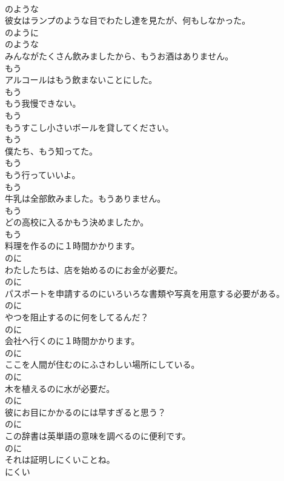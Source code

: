 \documentclass[8pt]{extreport}
\begin{document}
\begin{CJK}{UTF8}{min}
\\	のような	
\\	彼女はランプのような目でわたし達を見たが、何もしなかった。	
\\	のように 
\\	のような	
\\	みんながたくさん飲みましたから、もうお酒はありません。	
\\	もう	
\\	アルコールはもう飲まないことにした。	
\\	もう	
\\	もう我慢できない。	
\\	もう	
\\	もうすこし小さいボールを貸してください。	
\\	もう	
\\	僕たち、もう知ってた。	
\\	もう	
\\	もう行っていいよ。	
\\	もう	
\\	牛乳は全部飲みました。もうありません。	
\\	もう	
\\	どの高校に入るかもう決めましたか。	
\\	もう	
\\	料理を作るのに１時間かかります。	
\\	のに	
\\	わたしたちは、店を始めるのにお金が必要だ。	
\\	のに	
\\	パスポートを申請するのにいろいろな書類や写真を用意する必要がある。	
\\	のに	
\\	やつを阻止するのに何をしてるんだ？	
\\	のに	
\\	会社へ行くのに１時間かかります。	
\\	のに	
\\	ここを人間が住むのにふさわしい場所にしている。	
\\	のに	
\\	木を植えるのに水が必要だ。	
\\	のに	
\\	彼にお目にかかるのには早すぎると思う？	
\\	のに	
\\	この辞書は英単語の意味を調べるのに便利です。	
\\	のに	
\\	それは証明しにくいことね。	
\\	にくい	

\end{CJK}
\end{document}
